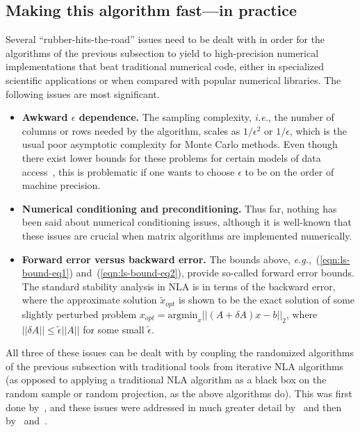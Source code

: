 \documentclass[twoside]{article}
\begin{document}
\subsection{Making this algorithm fast---in practice}
\label{sxn:least-squares:faster-pr}

Several ``rubber-hits-the-road'' issues need to be dealt with in order for 
the algorithms of the previous subsection to yield to high-precision 
numerical implementations that beat traditional numerical code, either in 
specialized scientific applications or when compared with popular numerical 
libraries.
The following issues are most significant.
\begin{itemize}
\item
\textbf{Awkward $\epsilon$ dependence.}
The sampling complexity, \emph{i.e.}, the number of columns or rows needed 
by the algorithm, scales as $1/\epsilon^2$ or $1/\epsilon$, which is the 
usual poor asymptotic complexity for Monte Carlo methods.
Even though there exist lower bounds for these problems for certain models
of data access~\cite{CW09}, this is problematic if one wants to choose 
$\epsilon$ to be on the order of machine precision.
\item
\textbf{Numerical conditioning and preconditioning.}
Thus far, nothing has been said about numerical conditioning issues, although
it is well-known that these issues are crucial when matrix algorithms are 
implemented numerically.
\item
\textbf{Forward error versus backward error.}
The bounds above, \emph{e.g.},~(\ref{eqn:ls-bound-eq1}) 
and~(\ref{eqn:ls-bound-eq2}), provide so-called forward error bounds.
The standard stability analysis in NLA is in terms of the backward error, 
where the approximate solution $\tilde{x}_{opt}$ is shown to be the exact 
solution of some slightly perturbed problem 
$x_{opt} = \mbox{argmin}_x ||(A+ \delta A)x-b||_2 $, where 
$||\delta A|| \le \tilde{\epsilon}||A||$ for some small $\tilde{\epsilon}$.
\end{itemize}
All three of these issues can be dealt with by coupling the randomized 
algorithms of the previous subsection with traditional tools from 
iterative NLA algorithms (as opposed to applying a traditional NLA algorithm 
as a black box on the random sample or random projection, as the above 
algorithms do).
This was first done by~\cite{RT08}, and these issues were addressed in much 
greater detail by~\cite{AMT10} and then by~\cite{CRT11} and~\cite{MSM11_TR}.
\end{document}
